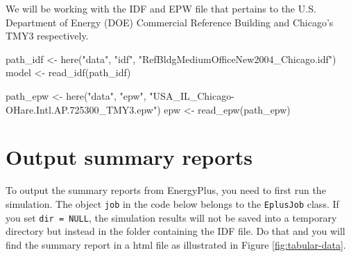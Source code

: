 \documentclass[
]{book}
\newenvironment{Shaded}{\begin{snugshade}}{\end{snugshade}}
\newcommand{\AttributeTok}[1]{\textcolor[rgb]{0.77,0.63,0.00}{#1}}
\newcommand{\DocumentationTok}[1]{\textcolor[rgb]{0.56,0.35,0.01}{\textbf{\textit{#1}}}}
\newcommand{\FunctionTok}[1]{\textcolor[rgb]{0.00,0.00,0.00}{#1}}
\newcommand{\NormalTok}[1]{#1}
\newcommand{\OtherTok}[1]{\textcolor[rgb]{0.56,0.35,0.01}{#1}}
\newcommand{\SpecialCharTok}[1]{\textcolor[rgb]{0.00,0.00,0.00}{#1}}
\newcommand{\StringTok}[1]{\textcolor[rgb]{0.31,0.60,0.02}{#1}}
\begin{document}
We will be working with the IDF and EPW file that pertains to the U.S. Department of Energy (DOE) Commercial Reference Building and Chicago's TMY3 respectively.

\begin{Shaded}
\begin{Highlighting}[]
\NormalTok{path\_idf }\OtherTok{\textless{}{-}} \FunctionTok{here}\NormalTok{(}\StringTok{"data"}\NormalTok{, }\StringTok{"idf"}\NormalTok{, }\StringTok{"RefBldgMediumOfficeNew2004\_Chicago.idf"}\NormalTok{)}
\NormalTok{model }\OtherTok{\textless{}{-}} \FunctionTok{read\_idf}\NormalTok{(path\_idf)}

\NormalTok{path\_epw }\OtherTok{\textless{}{-}} \FunctionTok{here}\NormalTok{(}\StringTok{"data"}\NormalTok{, }\StringTok{"epw"}\NormalTok{, }\StringTok{"USA\_IL\_Chicago{-}OHare.Intl.AP.725300\_TMY3.epw"}\NormalTok{)}
\NormalTok{epw }\OtherTok{\textless{}{-}} \FunctionTok{read\_epw}\NormalTok{(path\_epw)}
\end{Highlighting}
\end{Shaded}

\hypertarget{output-summary-reports}{%
\section{Output summary reports}\label{output-summary-reports}}

To output the summary reports from EnergyPlus, you need to first run the simulation. The object \texttt{job} in the code below belongs to the \texttt{EplusJob} class. If you set \texttt{dir\ =\ NULL}, the simulation results will not be saved into a temporary directory but instead in the folder containing the IDF file. Do that and you will find the summary report in a html file as illustrated in Figure \ref{fig:tabular-data}.

\begin{Shaded}
\end{Shaded}
\end{document}
